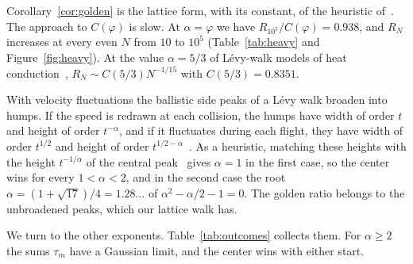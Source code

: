 Corollary~\ref{cor:golden} is the lattice form, with its constant, of the
heuristic of~\cite[Section~6.2.1.3, Eq.~(6.49)]{wlh2016}. The approach to $C(\varphi)$ is
slow. At $\alpha=\varphi$ we have $R_{10^5}/C(\varphi)=0.938$, and $R_N$
increases at every even $N$ from $10$ to $10^5$ (Table~\ref{tab:heavy} and
Figure~\ref{fig:heavy}). At the value $\alpha=5/3$ of L\'evy-walk models of
heat conduction~\cite{cdp2005,dsd2013,zdk2015}, $R_N\sim C(5/3)N^{-1/15}$ with
$C(5/3)=0.8351$.

\begin{remark}\label{rem:humps}
With velocity fluctuations the ballistic side peaks of a L\'evy walk broaden
into humps. If the speed is
redrawn at each collision, the humps have width of order $t$ and height of
order $t^{-\alpha}$, and if it fluctuates during each flight, they have width
of order $t^{1/2}$ and height of order
$t^{1/2-\alpha}$~\cite[Table~I]{dzh2012}. As a heuristic, matching these heights with the
height $t^{-1/\alpha}$ of the central
peak~\cite[Section~6.2.1.3, Eq.~(6.49)]{wlh2016} gives $\alpha=1$ in the first case, so the center wins for
every $1<\alpha<2$, and in the second case the root
$\alpha=(1+\sqrt{17})/4=1.28\ldots$ of $\alpha^2-\alpha/2-1=0$. The golden
ratio belongs to the unbroadened peaks, which our lattice walk has.
\end{remark}

We turn to the other exponents. Table~\ref{tab:outcomes} collects them. For
$\alpha\ge2$ the sums $\tau_m$ have a Gaussian limit, and the center wins
with either start.

